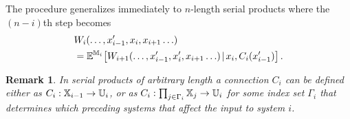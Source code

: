 \documentclass[conference]{IEEEtran}
\newtheorem{remark}{Remark}
\begin{document}
The procedure generalizes immediately to $n$-length serial products where the $(n-i)$th step becomes
\begin{equation}
\label{eq:general_decomp}
\begin{aligned}
	& W_i (\ldots, x_{i-1}', x_i, x_{i+1} \ldots) \\
	& = \mathbb{E}^{\MDP_i}\hspace{-0.5mm}  \left[ W_{i+1} (\ldots, x_{i-1}', x_i', x_{i+1} \ldots) \hspace{-0.5mm} \mid\hspace{-0.5mm}  x_i, C_i(x_{i-1}') \right].
\end{aligned}
\end{equation}

\begin{remark}
  In serial products of arbitrary length a connection $C_i$ can be defined either as $C_i: \mathbb{X}_{i-1} \rightarrow \mathbb{U}_i$, or as $C_i: \prod_{j \in \Gamma_i} \mathbb{X}_j \rightarrow \mathbb{U}_i$ for some index set $\Gamma_i$ that determines which preceding systems that affect the input to system $i$.
\end{remark}
\end{document}

